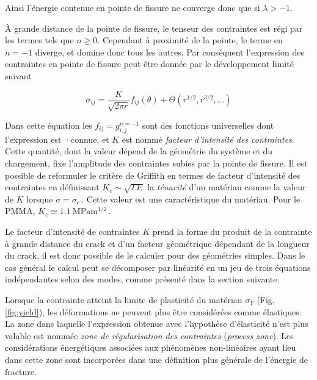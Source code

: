 Ainsi l'énergie contenue en pointe de fissure ne converge donc que si $\lambda > -1$.

À grande distance de la pointe de fissure, le tenseur des contraintes est régi par les termes tels que $n\geq0$. Cependant à proximité de la pointe, le terme en $n=-1$ diverge, et domine donc tous les autres. Par conséquent l'expression des contraintes en pointe de fissure peut être donnée par le développement limité suivant\,\cite{sun_fracture_2012}

\begin{equation}
\sigma_{ij} = \frac{K}{\sqrt{2\pi r}}f_{ij}(\theta)+\Theta\left(r^{1/2},r^{3/2},\dots\right)
\label{eq:joceline}
\end{equation}

Dans cette équation les $f_{ij}=g_{i,j}^{n=-1}$ sont des fonctions universelles dont l'expression est ·connue, et $K$ est nommé \textit{facteur d'intensité des contraintes}. Cette quantité, dont la valeur dépend de la géométrie du système et du chargement, fixe l'amplitude des contraintes subies par la pointe de fissure. Il est possible de reformuler le critère de Griffith en termes de facteur d'intensité des contraintes en définissant $K_c\sim\sqrt{\Gamma E}$ la \textit{ténacité} d'un matériau comme la valeur de $K$ lorsque $\sigma=\sigma_c$\,\cite{irwin_analysis_1957}. Cette valeur est une caractéristique du matériau. Pour le PMMA, $K_c\simeq\SI{1.1}{\mega\pascal\meter\tothe{1/2}}$\,\cite{ohring_engineering_1995}.

Le facteur d'intensité de contraintes $K$ prend la forme du produit de la contrainte à grande distance du crack et d'un facteur géométrique dépendant de la longueur du crack, il est donc possible de le calculer pour des géométries simples. Dans le cas général le calcul peut se décomposer par linéarité en un jeu de trois équations indépendantes selon des modes, comme présenté dans la section suivante.

Lorsque la contrainte atteint la limite de plasticité du matériau $\sigma_Y$ (Fig.\,\ref{fig:yield}), les déformations ne peuvent plus être considérées comme élastiques. La zone dans laquelle l'expression obtenue avec l'hypothèse d'élasticité n'est plus valable est nommée \textit{zone de régularisation des contraintes} (\textit{process zone}). Les considérations énergétiques associées aux phénomènes non-linéaires ayant lieu dans cette zone sont incorporées dans une définition plus générale de l'énergie de fracture.



